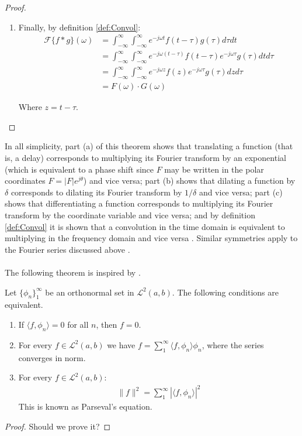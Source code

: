 \begin{proof}
\begin{enumerate}[label=(\alph*)]
\item Finally, by definition \ref{def:Convol}:
\begin{align*}
\mathcal{F}\{f*g\}(\omega) &= \int_{-\infty}^\infty \int_{-\infty}^\infty e^{-j \omega t} f(t - \tau) g(\tau) d\tau dt \\
&= \int_{-\infty}^\infty \int_{-\infty}^\infty e^{-j\omega(t-\tau)} f(t-\tau) e^{-j\omega \tau} g(\tau) dt d\tau \\
&= \int_{-\infty}^\infty \int_{-\infty}^\infty e^{-j\omega z} f(z) e^{-j\omega \tau} g(\tau) dz d\tau \\
&= F(\omega) \cdot G(\omega)
\end{align*}

Where $z = t - \tau$.
\end{enumerate}
\end{proof}

\noindent
In all simplicity, part (a) of this theorem shows that translating a function (that is, a delay) corresponds to multiplying its Fourier transform by an exponential (which is equivalent to a phase shift since $F$ may be written in the polar coordinates $F = |F|e^{j\theta}$) and vice versa; part (b) shows that dilating a function by $\delta$ corresponds to dilating its Fourier transform by $1/\delta$ and vice versa; part (c) shows that differentiating a function corresponds to multiplying its Fourier transform by the coordinate variable and vice versa; and by definition \ref{def:Convol} it is shown that a convolution in the time domain is equivalent to multiplying in the frequency domain and vice versa \cite{page 215, FAA}. Similar symmetries apply to the Fourier series discussed above \cite{page 60, DTSP}.
\\ \\
The following theorem is inspired by \cite{page 77, FAA}.

\begin{theorem}
Let $\{\phi_n\}_1^\infty$ be an orthonormal set in $\mathcal{L}^2(a,b)$. The following conditions are equivalent.
\begin{enumerate}[label=(\alph*)]
\item If $\langle f, \phi_n \rangle = 0$ for all $n$, then $f = 0$.
\item For every $f \in \mathcal{L}^2(a,b)$ we have $f = \sum_1^\infty \langle f, \phi_n \rangle \phi_n$, where the series converges in norm.\\
\item For every $f \in \mathcal{L}^2(a,b)$:
\begin{align*}
\|f\|^2 = \sum_1^\infty |\langle f,\phi_n \rangle|^2
\end{align*}
This is known as Parseval's equation.
\end{enumerate}
\end{theorem}

\begin{proof}
Should we prove it?
\end{proof}